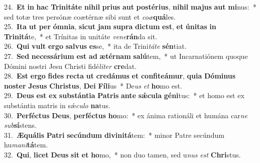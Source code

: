 {24.~}\textbf{Et} \textbf{in} \textbf{hac} \textbf{Tri}\textbf{ni}\textbf{tá}\textbf{te} \textbf{ni}\textbf{hil} \textbf{pri}\textbf{us} \textbf{aut} \textbf{po}\textbf{sté}\textbf{ri}\textbf{us}, \textbf{ni}\textbf{hil} \textbf{ma}\textbf{jus} \textbf{aut} \textbf{mi}nus:~* sed totæ tres persónæ coætérnæ sibi sunt et \textit{co}\textit{æ}\textbf{quá}les.\\
{25.~}\textbf{I}\textbf{ta} \textbf{ut} \textbf{per} \textbf{óm}\textbf{ni}\textbf{a}, \textbf{si}\textbf{cut} \textbf{jam} \textbf{su}\textbf{pra} \textbf{di}\textbf{ctum} \textbf{est}, \textbf{et} \textbf{ú}\textbf{ni}\textbf{tas} \textbf{in} \textbf{Tri}\textbf{ni}\textbf{tá}te,~* et Trínitas in unitáte \textit{ve}\textit{ne}\textbf{rán}da sit.\\
{26.~}\textbf{Qui} \textbf{vult} \textbf{er}\textbf{go} \textbf{sal}\textbf{vus} \textbf{es}se,~* ita de Trini\textit{tá}\textit{te} \textbf{sén}tiat.\\
{27.~}\textbf{Sed} \textbf{ne}\textbf{ces}\textbf{sá}\textbf{ri}\textbf{um} \textbf{est} \textbf{ad} \textbf{æ}\textbf{tér}\textbf{nam} \textbf{sa}\textbf{lú}tem,~* ut Incarnatiónem quoque Dómini nostri Jesu Christi fidé\textit{li}\textit{ter} \textbf{cre}dat.\\
{28.~}\textbf{Est} \textbf{er}\textbf{go} \textbf{fi}\textbf{des} \textbf{re}\textbf{cta} \textbf{ut} \textbf{cre}\textbf{dá}\textbf{mus} \textbf{et} \textbf{con}\textbf{fi}\textbf{te}\textbf{á}\textbf{mur}, \textbf{qui}\textbf{a} \textbf{Dó}\textbf{mi}\textbf{nus} \textbf{no}\textbf{ster} \textbf{Je}\textbf{sus} \textbf{Chri}\textbf{stus}, \textbf{De}\textbf{i} \textbf{Fí}\textbf{li}us~* De\textit{us} \textit{et} \textbf{ho}mo est.\\
{29.~}\textbf{De}\textbf{us} \textbf{est} \textbf{ex} \textbf{sub}\textbf{stán}\textbf{ti}\textbf{a} \textbf{Pa}\textbf{tris} \textbf{an}\textbf{te} \textbf{sǽ}\textbf{cu}\textbf{la} \textbf{gé}\textbf{ni}tus:~* et homo est ex substántia matris in sǽ\textit{cu}\textit{lo} \textbf{na}tus.\\
{30.~}\textbf{Per}\textbf{fé}\textbf{ctus} \textbf{De}\textbf{us}, \textbf{per}\textbf{fé}\textbf{ctus} \textbf{ho}mo:~* ex ánima rationáli et humána car\textit{ne} \textit{sub}\textbf{sí}stens.\\
{31.~}\textbf{Æ}\textbf{quá}\textbf{lis} \textbf{Pa}\textbf{tri} \textbf{se}\textbf{cún}\textbf{dum} \textbf{di}\textbf{vi}\textbf{ni}\textbf{tá}tem:~* minor Patre secúndum hu\textit{ma}\textit{ni}\textbf{tá}tem.\\
{32.~}\textbf{Qui}, \textbf{li}\textbf{cet} \textbf{De}\textbf{us} \textbf{sit} \textbf{et} \textbf{ho}mo,~* non duo tamen, sed u\textit{nus} \textit{est} \textbf{Chri}stus.\\

